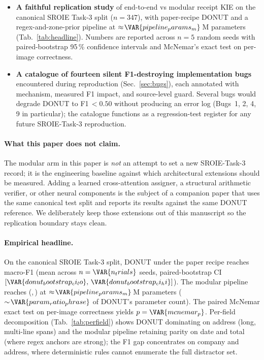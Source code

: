 \begin{itemize}
\item \textbf{A faithful replication study} of end-to-end vs modular
  receipt KIE on the canonical SROIE Task-3 split ($n=347$), with
  paper-recipe DONUT and a regex-and-zone-prior pipeline at
  $\approx\!\VAR{pipeline_params_m}$\,M parameters
  (Tab.~\ref{tab:headline}).  Numbers are reported across $n=5$
  random seeds with paired-bootstrap 95\,\% confidence intervals and
  McNemar's exact test on per-image correctness.
\item \textbf{A catalogue of fourteen silent F1-destroying
  implementation bugs} encountered during reproduction
  (Sec.~\ref{sec:bugs}), each annotated with mechanism, measured F1
  impact, and source-level guard.  Several bugs would degrade DONUT
  to F1\,$<\!0.50$ without producing an error log
  (Bugs~1, 2, 4, 9 in particular); the catalogue functions as a
  regression-test register for any future SROIE-Task-3 reproduction.
\end{itemize}

\paragraph{What this paper does not claim.}  The modular arm in this
paper is \emph{not} an attempt to set a new SROIE-Task-3 record; it
is the engineering baseline against which architectural extensions
should be measured.  Adding a learned cross-attention assigner, a
structural arithmetic verifier, or other neural components is the
subject of a companion paper that uses the same canonical test split
and reports its results against the same DONUT reference.  We
deliberately keep those extensions out of this manuscript so the
replication boundary stays clean.

\paragraph{Empirical headline.}  On the canonical SROIE Task-3 split,
DONUT under the paper recipe reaches  macro-F1 (mean
across $n=\VAR{n_trials}$ seeds, paired-bootstrap CI
$[\VAR{donut_bootstrap_ci_lo},\,\VAR{donut_bootstrap_ci_hi}]$).
The modular pipeline reaches 
(,\,) at
$\approx\!\VAR{pipeline_params_m}$\,M parameters
($\sim\!\VAR{param_ratio_phrase}$ of DONUT's parameter count).  The
paired McNemar exact test on per-image correctness yields
$p=\VAR{mcnemar_p}$.  Per-field decomposition
(Tab.~\ref{tab:perfield}) shows DONUT dominating on \textsf{address}
(long, multi-line spans) and the modular pipeline retaining parity
on \textsf{date} and \textsf{total} (where regex anchors are
strong); the F1 gap concentrates on \textsf{company} and
\textsf{address}, where deterministic rules cannot enumerate the
full distractor set.
